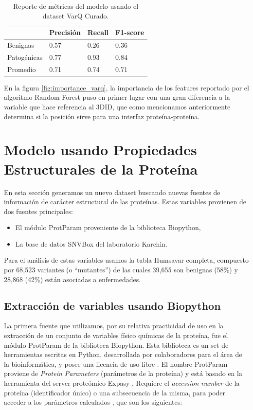\begin{table}[H]
\centering
\begin{tabular}{|l|l|l|l|}
\hline
              & Precisión & Recall & F1-score \\ \hline
Benignas      & 0.57      & 0.26   & 0.36     \\ \hline
Patogénicas   & 0.77      & 0.93   & 0.84     \\ \hline
Promedio      & 0.71      & 0.74   & 0.71     \\ \hline   
\end{tabular}
\caption{Reporte de métricas del modelo usando el dataset VarQ Curado.}

\label{fig:metrics_varq}
\end{table}

En la figura \ref{fig:importance_varq}, la importancia de los features reportado por el algoritmo Random Forest puso en primer lugar con una gran diferencia a la variable que hace referencia al 3DID, que como mencionamos anteriormente determina si la posición sirve para una interfaz proteína-proteína.  

\newpage

\section{Modelo usando Propiedades Estructurales de la Proteína}

En esta sección generamos un nuevo dataset buscando nuevas fuentes de información de carácter estructural de las proteínas. Estas variables provienen de dos fuentes principales:

\begin{itemize}
    \item El módulo ProtParam proveniente de la biblioteca Biopython,
    \item La base de datos SNVBox del laboratorio Karchin.
\end{itemize}

Para el análisis de estas variables usamos la tabla Humsavar completa, compuesto por 68,523 variantes (o ``mutantes'') de las cuales 39,655 son benignas (58\%) y 28,868 (42\%) están asociadas a enfermedades. 

\subsection{Extracción de variables usando Biopython}

La primera fuente que utilizamos, por su relativa practicidad de uso en la extracción de un conjunto de variables físico químicas de la proteína, fue el módulo ProtParam de la biblioteca Biopython. Esta biblioteca es un set de herramientas escritas en Python, desarrollada por colaboradores para el área de la bioinformática, y posee una licencia de uso libre \todo{[ref]}.
El nombre ProtParam proviene de \textit{Protein Parameters} (parámetros de la proteína) y está basado en la herramienta del server proteómico Expasy \todo{[ref]}. Requiere el \textit{accession number} de la proteína (identificador único) o una subsecuencia de la misma, para poder acceder a los parámetros calculados \todo{[ref]}, que son los siguientes:

